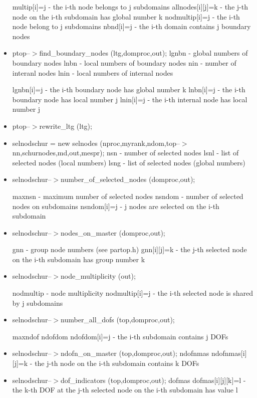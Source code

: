 \begin{itemize}
multip[i]=j - the i-th node belongs to j subdomains
allnodes[i][j]=k - the j-th node on the i-th subdomain has global number k
nodmultip[i]=j - the i-th node belong to j subdomains
nbnd[i]=j - the i-th domain contains j boundary nodes


\item
ptop--$>$find\_boundary\_nodes (ltg,domproc,out);
\newline
lgnbn - global numbers of boundary nodes
lnbn - local numbers of boundary nodes
nin - number of interanl nodes
lnin - local numbers of internal nodes

lgnbn[i]=j - the i-th boundary node has global number k
lnbn[i]=j - the i-th boundary node has local number j
lnin[i]=j - the i-th internal node has local number j


\item
ptop--$>$rewrite\_ltg (ltg);

\item
selnodschur = new selnodes (nproc,myrank,ndom,top--$>$nn,schurnodes,md,out,mespr);
nsn - number of selected nodes
lsnl - list of selected nodes (local numbers)
lsng - list of selected nodes (global numbers)

\item
selnodschur--$>$number\_of\_selected\_nodes (domproc,out);

maxnsn - maximum number of selected nodes
nsndom - number of selected nodes on subdomains
nsndom[i]=j - j nodes are selected on the i-th subdomain

\item
selnodschur--$>$nodes\_on\_master (domproc,out);

gnn - group node numbers (see partop.h)
gnn[i][j]=k - the j-th selected node on the i-th subdomain has group number k

\item
selnodschur--$>$node\_multiplicity (out);

nodmultip - node multiplicity
nodmultip[i]=j - the i-th selected node is shared by j subdomains

\item
selnodschur--$>$number\_all\_dofs (top,domproc,out);

maxndof
ndofdom
ndofdom[i]=j - the i-th subdomain contains j DOFs

\item
selnodschur--$>$ndofn\_on\_master (top,domproc,out);
ndofnmas
ndofnmas[i][j]=k - the j-th node on the i-th subdomain contains k DOFs
 

\item
selnodschur--$>$dof\_indicators (top,domproc,out);
dofmas
dofmas[i][j][k]=l - the k-th DOF at the j-th selected node on the i-th subdomain has value l


\end{itemize}
